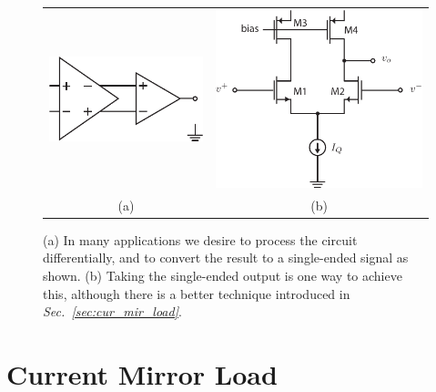 \begin{figure}[t]
\centering
\begin{tabular}{c c}
\includegraphics[scale=1.15]{Diff_in_SE_out} &
\includegraphics[scale=1.20]{diffamp_SE_out_simp}\\
(a) & (b)\\
\end{tabular}
\caption{(a) In many applications we desire to process the circuit differentially, and to convert the result to a single-ended signal as shown.   (b) Taking the single-ended output is one way to achieve this, although there is a better technique introduced in \emph{Sec.~\ref{sec:cur_mir_load}}.}
\label{fig:Diff_in_SE_out}
\end{figure}
\section{Current Mirror Load}
